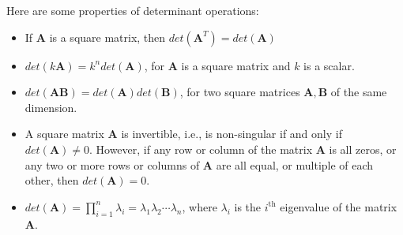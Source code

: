 \documentclass[conference,final,11pt,technote,onecolumn]{IEEEtran}\usepackage[]{graphicx}\usepackage[]{color}
\begin{document}
Here are some properties of determinant operations:
\begin{itemize}
\item If $\mathbf{A}$ is a square matrix, then $det(\mathbf{A}^T) = det(\mathbf{A})$
\item $det(k\mathbf{A}) = k^ndet(\mathbf{A})$, for $\mathbf{A}$ is a square matrix and $k$ is a scalar.
\item $det(\mathbf{AB}) = det(\mathbf{A})det(\mathbf{B})$, for two square matrices $\mathbf{A}, \mathbf{B}$ of the same dimension.
\item A square matrix $\mathbf{A}$ is invertible, i.e., is non-singular if and only if $det(\mathbf{A}) \neq 0$. However, if any row or column of the matrix $\mathbf{A}$ is all zeros, or any two or more rows or columns of $\mathbf{A}$ are all equal, or multiple of each other, then $det(\mathbf{A}) = 0$.
\item $det(\mathbf{A}) = \prod_{i=1}^n\lambda_i = \lambda_1\lambda_2\cdots\lambda_n$, where $\lambda_i$ is the $i^\text{th}$ eigenvalue of the matrix $\mathbf{A}$.
\end{itemize}
\end{document}
